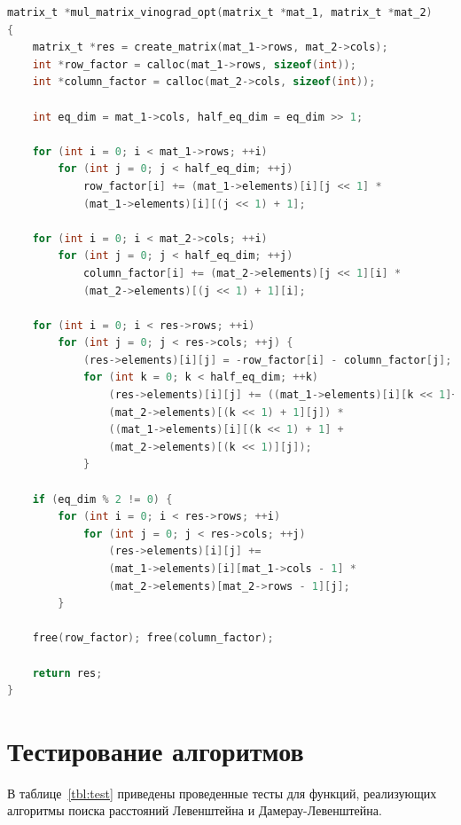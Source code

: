 \documentclass[a4paper,14pt, unknownkeysallowed]{extreport}
\begin{document}
\begin{lstlisting}[label=opt_wino,caption=Листинг оптимизированного алгоритма Винограда,language=C]
matrix_t *mul_matrix_vinograd_opt(matrix_t *mat_1, matrix_t *mat_2)
{
    matrix_t *res = create_matrix(mat_1->rows, mat_2->cols);
    int *row_factor = calloc(mat_1->rows, sizeof(int));
    int *column_factor = calloc(mat_2->cols, sizeof(int));
    
    int eq_dim = mat_1->cols, half_eq_dim = eq_dim >> 1;
    
    for (int i = 0; i < mat_1->rows; ++i)
        for (int j = 0; j < half_eq_dim; ++j)
            row_factor[i] += (mat_1->elements)[i][j << 1] * 
            (mat_1->elements)[i][(j << 1) + 1];
    
    for (int i = 0; i < mat_2->cols; ++i)
        for (int j = 0; j < half_eq_dim; ++j)
            column_factor[i] += (mat_2->elements)[j << 1][i] * 
            (mat_2->elements)[(j << 1) + 1][i];
    
    for (int i = 0; i < res->rows; ++i)
        for (int j = 0; j < res->cols; ++j) {
            (res->elements)[i][j] = -row_factor[i] - column_factor[j];
            for (int k = 0; k < half_eq_dim; ++k)
                (res->elements)[i][j] += ((mat_1->elements)[i][k << 1]+
                (mat_2->elements)[(k << 1) + 1][j]) * 
                ((mat_1->elements)[i][(k << 1) + 1] +
                (mat_2->elements)[(k << 1)][j]);
            }
    
    if (eq_dim % 2 != 0) {
        for (int i = 0; i < res->rows; ++i)
            for (int j = 0; j < res->cols; ++j)
                (res->elements)[i][j] += 
                (mat_1->elements)[i][mat_1->cols - 1] * 
                (mat_2->elements)[mat_2->rows - 1][j];
        }
    
    free(row_factor); free(column_factor);
    
    return res;
}

\end{lstlisting}

\section{Тестирование алгоритмов}

В таблице~\ref{tbl:test} приведены проведенные тесты для функций, реализующих алгоритмы поиска расстояний Левенштейна и Дамерау-Левенштейна.
\end{document}
